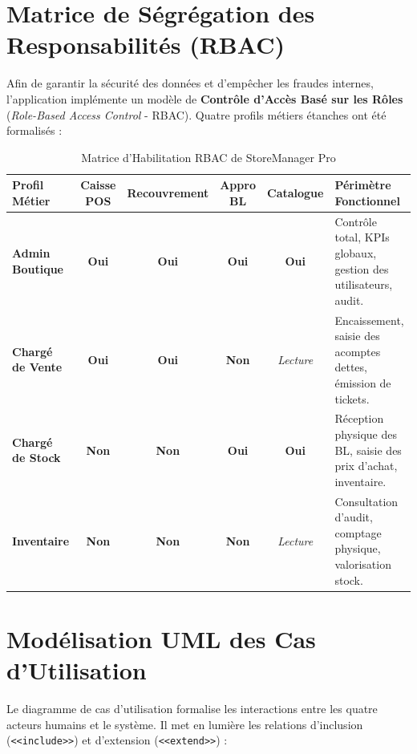 \documentclass[11pt,a4paper,titlepage,twoside,openright]{report}
\begin{document}
\section{Matrice de Ségrégation des Responsabilités (RBAC)}

Afin de garantir la sécurité des données et d'empêcher les fraudes internes, l'application implémente un modèle de \textbf{Contrôle d'Accès Basé sur les Rôles} (\emph{Role-Based Access Control} - RBAC). Quatre profils métiers étanches ont été formalisés :

\begin{table}[htbp]
\centering
\small
\begin{tabularx}{\textwidth}{lccccX}
\toprule
\textbf{Profil Métier} & \textbf{Caisse POS} & \textbf{Recouvrement} & \textbf{Appro BL} & \textbf{Catalogue} & \textbf{Périmètre Fonctionnel} \\
\midrule
\textbf{Admin Boutique} & \textcolor{successGreen}{\textbf{Oui}} & \textcolor{successGreen}{\textbf{Oui}} & \textcolor{successGreen}{\textbf{Oui}} & \textcolor{successGreen}{\textbf{Oui}} & Contrôle total, KPIs globaux, gestion des utilisateurs, audit. \\
\textbf{Chargé de Vente} & \textcolor{successGreen}{\textbf{Oui}} & \textcolor{successGreen}{\textbf{Oui}} & \textcolor{alertRed}{\textbf{Non}} & \textit{Lecture} & Encaissement, saisie des acomptes dettes, émission de tickets. \\
\textbf{Chargé de Stock} & \textcolor{alertRed}{\textbf{Non}} & \textcolor{alertRed}{\textbf{Non}} & \textcolor{successGreen}{\textbf{Oui}} & \textcolor{successGreen}{\textbf{Oui}} & Réception physique des BL, saisie des prix d'achat, inventaire. \\
\textbf{Inventaire} & \textcolor{alertRed}{\textbf{Non}} & \textcolor{alertRed}{\textbf{Non}} & \textcolor{alertRed}{\textbf{Non}} & \textit{Lecture} & Consultation d'audit, comptage physique, valorisation stock. \\
\bottomrule
\end{tabularx}
\caption{Matrice d'Habilitation RBAC de StoreManager Pro}
\label{tab:rbac_matrix}
\end{table}

\section{Modélisation UML des Cas d'Utilisation}

Le diagramme de cas d'utilisation formalise les interactions entre les quatre acteurs humains et le système. Il met en lumière les relations d'inclusion (\texttt{<<include>>}) et d'extension (\texttt{<<extend>>}) :
\end{document}
